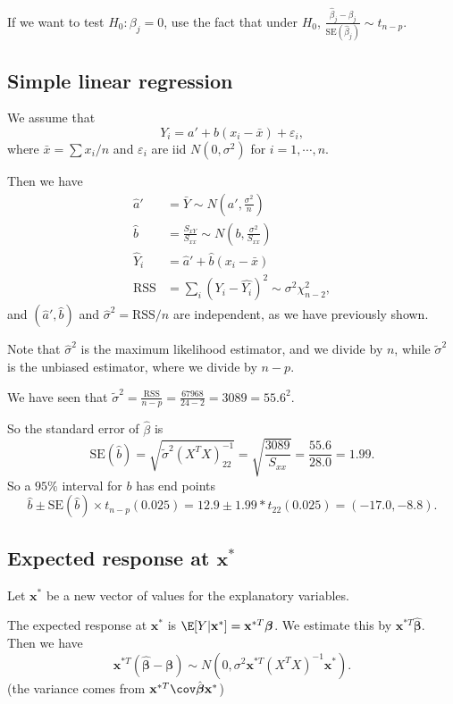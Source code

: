 \documentclass[a4paper]{article}
\begin{document}
If we want to test $H_0: \beta_j = 0$, use the fact that under $H_0$, $\frac{\hat{\beta}_j - \beta_j}{\mathrm{SE}(\hat{\beta}_j)} \sim t_{n - p}$.

\subsection{Simple linear regression}
We assume that
\[
  Y_i = a' + b(x_i - \bar x) + \varepsilon_i,
\]
where $\bar x = \sum x_i/n$ and $\varepsilon_i$ are iid $N(0, \sigma^2)$ for $i = 1, \cdots, n$.

Then we have
\begin{align*}
  \hat{a}' &= \bar Y \sim N\left(a', \frac{\sigma^2}{n}\right)\\
  \hat{b} &= \frac{S_{xY}}{S_{xx}}\sim N\left(b, \frac{\sigma^2}{S_{xx}}\right)\\
  \hat{Y}_i &= \hat{a}' + \hat{b}(x_i - \bar x)\\
  \mathrm{RSS} &= \sum_i (Y_i - \hat{Y_i})^2 \sim \sigma^2 \chi_{n - 2}^2,
\end{align*}
and $(\hat{a}', \hat{b})$ and $\hat{\sigma}^2 = \text{RSS}/n$ are independent, as we have previously shown.

Note that $\hat{\sigma}^2$ is the maximum likelihood estimator, and we divide by $n$, while $\tilde{\sigma}^2$ is the unbiased estimator, where we divide by $n - p$.

\begin{eg}
  We have seen that $\tilde{\sigma}^2 = \frac{\mathrm{RSS}}{n - p} = \frac{67968}{24 - 2} = 3089 = 55.6^2$.

  So the standard error of $\hat{\beta}$ is
  \[
    \mathrm{SE}(\hat{b}) = \sqrt{\tilde{\sigma}^2(X^TX)_{22}^{-1}} = \sqrt{\frac{3089}{S_{xx}}} = \frac{55.6}{28.0} = 1.99.
  \]
  So a $95\%$ interval for $b$ has end points
  \[
    \hat{b}\pm \mathrm{SE}(\hat{b})\times t_{n - p}(0.025) = 12.9\pm 1.99*t_{22}(0.025) = (-17.0, -8.8).
  \]
\end{eg}
\subsection{Expected response at \texorpdfstring{$\mathbf{x}^*$}{x*}}
Let $\mathbf{x}^*$ be a new vector of values for the explanatory variables.

The expected response at $\mathbf{x}^*$ is $\E[Y|\mathbf{x}^*] = \mathbf{x}^{*T}\boldsymbol\beta$. We estimate this by $\mathbf{x}^{*T}\hat{\boldsymbol\beta}$. Then we have
\[
  \mathbf{x}^{*T}(\hat{\boldsymbol\beta} - \boldsymbol\beta)\sim N(0, \sigma^2\mathbf{x}^{*T}(X^TX)^{-1}\mathbf{x}^*).
\]
(the variance comes from $\mathbf{x}^{*T}\cov \hat{\boldsymbol\beta} \mathbf{x}^*$)
\end{document}
